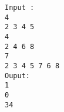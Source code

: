 \begin{verbatim}
Input :
4  
2 3 4 5 
4 
2 4 6 8 
7 
2 3 4 5 7 6 8 
Ouput: 
1 
0 
34 
\end{verbatim}